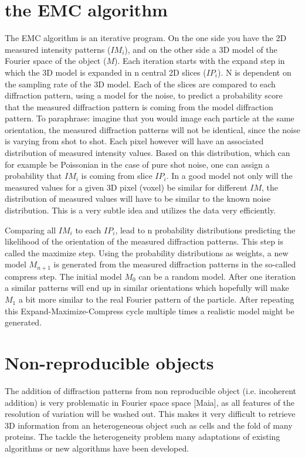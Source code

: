 \section{the EMC algorithm}
The EMC algorithm is an iterative program. On the one side you have the 2D measured intensity patterns ($IM_i$), and on the other side a 3D model of the Fourier space of the object ($M$). Each iteration starts with the expand step in which the 3D model is expanded in n central 2D slices ($IP_i$). N is dependent on the sampling rate of the 3D model. Each of the slices are compared to each diffraction pattern, using a model for the noise, to predict a probability score that the measured diffraction pattern is coming from the model diffraction pattern. To paraphrase: imagine that you would image each particle at the same orientation, the measured diffraction patterns will not be identical, since the noise is varying from shot to shot. Each pixel however will have an associated distribution of measured intensity values. Based on this distribution, which can for example be Poissonian in the case of pure shot noise, one can assign a probability that $IM_i$ is coming from slice $IP_i$. In  a good model not only will the measured values for a given 3D pixel (voxel) be similar for different $IM$, the distribution of measured values will have to be similar to the known noise distribution. This is a very subtle idea and utilizes the data very efficiently.

Comparing all $IM_i$ to each $IP_i$, lead to n probability distributions predicting the likelihood of the orientation of the measured diffraction patterns. This step is called the maximize step. Using the probability distributions as weights, a new model $M_{n+1}$ is generated from the measured diffraction patterns in the so-called compress step. 
The initial model $M_0$ can be a random model. After one iteration a similar patterns will end up in similar orientations which hopefully will make $M_1$ a bit more similar to the real Fourier pattern of the particle. After repeating this Expand-Maximize-Compress cycle multiple times a realistic model might be generated.

\section{Non-reproducible objects}
The addition of diffraction patterns from non reproducible object (i.e. incoherent addition) is very problematic in Fourier space space [Maia], as all features of the resolution of variation will be washed out. This makes it very difficult to retrieve 3D information from an heterogeneous object such as cells and the fold of many proteins. The tackle the heterogeneity problem many adaptations of existing algorithms or new algorithms have been developed.

